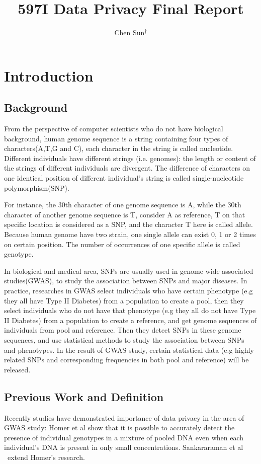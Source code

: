 \documentclass[12pt, singlespace]{article}
\title{ 597I Data Privacy Final Report}
\author{Chen Sun$^{\dagger}$}
\begin{document}
\maketitle
\let\thefootnote\relax{}
\section{Introduction}
\subsection{Background}

From the perspective of computer scientists who do not have biological background, human genome sequence is a string containing four types of characters(A,T,G and C), each character in the string is called nucleotide. Different individuals have different strings (i.e. genomes): the length or content of the strings of different individuals are divergent. The difference of characters on one identical position of different individual's string is called single-nucleotide polymorphism(SNP).

 For instance, the 30th character of one genome sequence is A, while the 30th character of another genome sequence is T, consider A as reference, T on that specific location is considered as a SNP, and the character T here is called allele. Because human genome have two strain, one single allele can exist 0, 1 or 2 times on certain position. The number of occurrences of one specific allele is called genotype.

In biological and medical area, SNPs are usually used in genome wide associated studies(GWAS), to study the association between SNPs and major diseases. 
In practice, researches in GWAS select individuals who have certain phenotype (e.g they all have Type II Diabetes) from a population to create a pool, then they select individuals who do not have that phenotype (e.g they all do not have Type II Diabetes) from a population to create a reference, and get genome sequences of individuals from pool and reference. Then they detect SNPs in these genome sequences, and use statistical methods to study the association between SNPs and phenotypes. In the result of GWAS study, certain statistical data (e.g highly related SNPs and corresponding frequencies in both pool and reference) will be released.


\subsection{Previous Work and Definition}
Recently studies have demonstrated importance of data privacy in the area of GWAS study:   Homer et al\cite{homer2008resolving} show that it is possible to accurately detect the presence of individual genotypes in a mixture of pooled DNA even when each individual's DNA is present in only small concentrations. Sankararaman et al ~\cite{sankararaman2009genomic}extend Homer's research.
\end{document}
